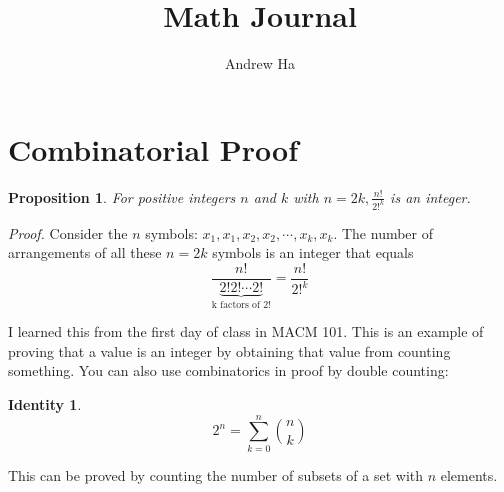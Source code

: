 \documentclass[11pt, oneside]{article}   	%
\title{Math Journal}
\author{Andrew Ha}
\date{}							%
\newtheorem{proposition}{Proposition}
\newtheorem{identity}{Identity}
\begin{document}
\maketitle
\section*{Combinatorial Proof}
\begin{proposition} For positive integers $n$ and $k$ with $n=2k, \frac{n!}{2!^k}$ is an integer. \end{proposition}
\emph{Proof.}  Consider the $n$ symbols: $x_1, x_1, x_2, x_2, \cdots, x_k, x_k$.
The number of arrangements of all these $n = 2k$ symbols is an integer that equals
\[
\frac{n!}{\underbrace{2! 2! \cdots 2!}_{\text{k factors of 2!}}} = \frac{n!}{2!^k}
\]

I learned this from the first day of class in MACM 101. This is an example of proving that a value is an integer by obtaining that value from counting something. You can also use combinatorics in proof by double counting:
\begin{identity} 
\[
2^n = \sum_{k=0}^{n}  \binom{n}{k}
\]
\end{identity}

This can be proved by counting the number of subsets of a set with $n$ elements. 
\end{document}
